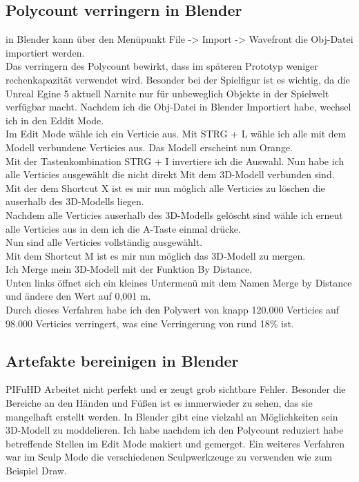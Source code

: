 \subsection{Polycount verringern in Blender}
in Blender kann über den Menüpunkt File -> Import -> Wavefront die Obj-Datei importiert werden. 
\\
Das verringern des Polycount bewirkt, dass im späteren Prototyp weniger rechenkapazität verwendet wird. Besonder bei der Spielfigur ist es wichtig, da die Unreal Egine 5 aktuell Narnite nur für unbeweglich Objekte in der Spielwelt verfügbar macht.
Nachdem ich die Obj-Datei in Blender Importiert habe, wechsel ich in den Eddit Mode.
\\
Im Edit Mode wähle ich ein Verticie aus. Mit STRG + L wähle ich alle mit dem Modell verbundene Verticies aus. Das Modell erscheint nun Orange.
\\
Mit der Tastenkombination STRG + I invertiere ich die Auswahl. Nun habe ich alle Verticies ausgewählt die nicht direkt Mit dem 3D-Modell verbunden sind.
\\
Mit der dem Shortcut X ist es mir nun möglich alle Verticies zu löschen die auserhalb des 3D-Modells liegen.
\\
Nachdem alle Verticies auserhalb des 3D-Modells gelöscht sind wähle ich erneut alle Verticies aus in dem ich die A-Taste einmal drücke.
\\
Nun sind alle Verticies vollständig ausgewählt.
\\
Mit dem Shortcut M ist es mir nun möglich das 3D-Modell zu mergen.
\\
Ich Merge mein 3D-Modell mit der Funktion By Distance.
\\
Unten links öffnet sich ein kleines Untermenü mit dem Namen Merge by Distance und ändere den Wert auf 0,001 m.
\\
Durch dieses Verfahren habe ich den Polywert von knapp 120.000 Verticies auf 98.000 Verticies verringert, was eine Verringerung von rund 18\% ist.
\subsection{Artefakte bereinigen in Blender}%
PIFuHD Arbeitet nicht perfekt und er zeugt grob sichtbare Fehler. Besonder die Bereiche an den Händen und Füßen ist es immerwieder zu sehen, das sie mangelhaft erstellt werden. In Blender gibt eine vielzahl an Möglichkeiten sein 3D-Modell zu moddelieren. Ich habe nachdem ich den Polycount reduziert habe betreffende Stellen im Edit Mode makiert und gemerget. Ein weiteres Verfahren war im Sculp Mode die verschiedenen Sculpwerkzeuge zu verwenden wie zum Beispiel Draw.
